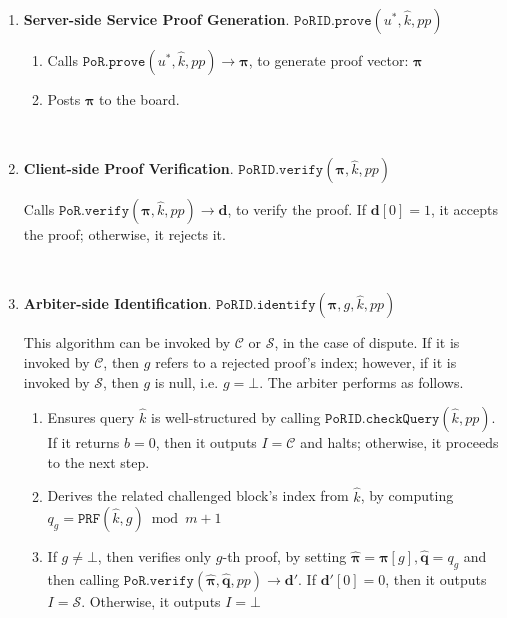 \begin{enumerate}
\begin{enumerate}
\end{enumerate}


\

\item\textbf{Server-side Service Proof Generation}. $\mathtt{PoRID.prove}(u^{\scriptscriptstyle *},\hat{k},pp)$ 
\begin{enumerate}
\item Calls $\mathtt{PoR.prove}(u^{\scriptscriptstyle *},\hat{k},pp)\rightarrow  {\bm{\pi}}$, to generate proof vector: $ {\bm{\pi}}$ 
\item Posts $ {\bm{\pi}}$ to the board. 
\end{enumerate}

\

\item\textbf{Client-side Proof Verification}\label{PoRID::Client-side-Proof-Verification}. $\mathtt{PoRID.verify}( {\bm{\pi}},\hat{k} ,pp)$

 Calls $\mathtt{PoR.verify}( {\bm{\pi}},\hat{k} ,pp)\rightarrow  {\bm{d}}$, to verify the proof. If $ {\bm{d}}[0] = 1$,  it accepts the proof; otherwise, it rejects it.


\

\item\textbf{Arbiter-side Identification}\label{PoRID::Arbiter-side-Identification}. $\mathtt{PoRID.identify}( {\bm{\pi}}, g,\hat{k},pp)$ 

This algorithm can be invoked by $\mathcal{C}$ or $\mathcal{S}$, in the case of dispute. If it is invoked by $\mathcal{C}$, then $g$ refers to a rejected proof's  index; however, if it is invoked by $\mathcal{S}$, then $g$ is null, i.e.  $g=\bot$. The arbiter performs as follows. 


\begin{enumerate}



\item Ensures  query $\hat{k}$ is well-structured by calling $\mathtt{PoRID.checkQuery}(\hat{k}, pp)$. If it returns $b=0$, then it outputs $I=\mathcal C$ and halts; otherwise, it proceeds to the next step. 




\item Derives the related challenged block's index from $\hat{k}$, by computing $q_{\scriptscriptstyle g}=\mathtt{PRF}(\hat{k},g)\bmod m+1$ 



\item If $g\neq \bot$, then verifies only $g$-th proof, by setting $\hat{\bm{\pi}}={\bm{\pi}}[g], \hat{\bm{q}}=q_{\scriptscriptstyle g}$ and then calling $\mathtt{PoR.verify}( \hat{\bm{\pi}},\hat{\bm{q}},pp)\rightarrow  {\bm{d}}'$. If $ {\bm{d}}'[0]=0$, then it outputs $I=\mathcal S$. Otherwise, it outputs $I=\bot$
\end{enumerate}
\end{enumerate}

